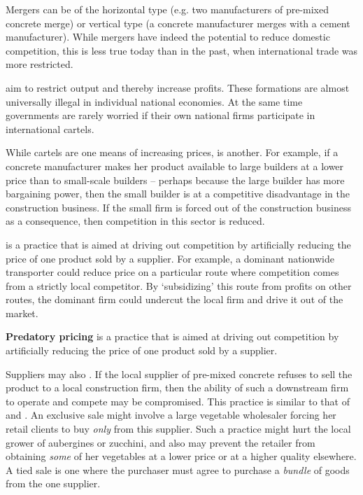 Mergers can be of the horizontal type (e.g. two manufacturers of pre-mixed concrete merge) or vertical type (a concrete manufacturer merges with a cement manufacturer). While mergers have indeed the potential to reduce domestic competition, this is less true today than in the past, when international trade was more restricted.

 aim to restrict output and thereby increase profits. These formations are almost universally illegal in individual national economies. At the same time governments are rarely worried if their own national firms participate in international cartels.

While cartels are one means of increasing prices,  is another. For example, if a concrete manufacturer makes her product available to large builders at a lower price than to small-scale builders -- perhaps because the large builder has more bargaining power, then the small builder is at a competitive disadvantage in the construction business. If the small firm is forced out of the construction business as a consequence, then competition in this sector is reduced. 

 is a practice that is aimed at driving out competition by artificially reducing the price of one product sold by a supplier. For example, a dominant nationwide transporter could reduce price on a particular route where competition comes from a strictly local competitor. By `subsidizing' this route from profits on other routes, the dominant firm could undercut the local firm and drive it out of the market.

\begin{DefBox}
\textbf{Predatory pricing} is a practice that is aimed at driving out competition by artificially reducing the price of one product sold by a supplier.
\end{DefBox}

Suppliers may also . If the local supplier of pre-mixed concrete refuses to sell the product to a local construction firm, then the ability of such a downstream firm to operate and compete may be compromised. This practice is similar to that of  and . An exclusive sale might involve a large vegetable wholesaler forcing her retail clients to buy \textit{only} from this supplier. Such a practice might hurt the local grower of aubergines or zucchini, and also may prevent the retailer from obtaining \textit{some} of her vegetables at a lower price or at a higher quality elsewhere. A tied sale is one where the purchaser must agree to purchase a \textit{bundle} of goods from the one supplier. 

